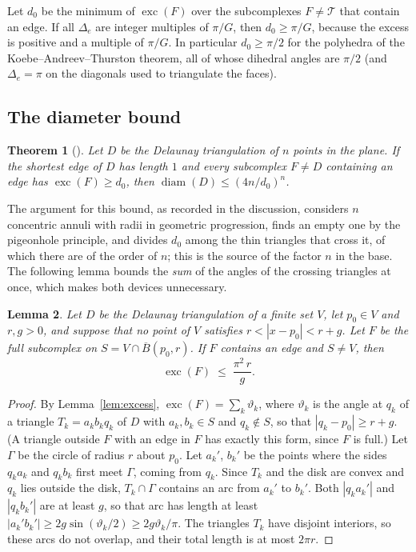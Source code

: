 \documentclass[11pt]{amsart}
\newtheorem{theorem}{Theorem}[section]
\newtheorem{lemma}[theorem]{Lemma}
\theoremstyle{definition}
\theoremstyle{remark}
\newcommand{\cT}{\mathcal{T}}
\DeclareMathOperator{\diam}{diam}
\DeclareMathOperator{\exc}{exc}
\begin{document}
Let $d_0$ be the minimum of $\exc(F)$ over the subcomplexes $F\neq\cT$ that contain an edge. If all $\Delta_e$ are integer multiples of $\pi/G$, then $d_0\ge\pi/G$, because the excess is positive and a multiple of $\pi/G$.
In particular $d_0\ge\pi/2$ for the polyhedra of the Koebe--Andreev--Thurston theorem, all of whose dihedral angles are $\pi/2$ (and $\Delta_e=\pi$ on the diagonals used to triangulate the faces).

\subsection{The diameter bound}

\begin{theorem}[{\cite[Theorem~6.3]{Riv03}}]\label{thm:six-three}
Let $D$ be the Delaunay triangulation of $n$ points in the plane. If the shortest edge of $D$ has length $1$ and every subcomplex $F\neq D$ containing an edge has $\exc(F)\ge d_0$, then $\diam(D)\le(4n/d_0)^n$.
\end{theorem}

The argument for this bound, as recorded in the discussion, considers $n$ concentric annuli with radii in geometric progression, finds an empty one by the pigeonhole principle, and divides $d_0$ among the thin triangles that cross it, of which there are of the order of $n$; this is the source of the factor $n$ in the base.
The following lemma bounds the \emph{sum} of the angles of the crossing triangles at once, which makes both devices unnecessary.

\begin{lemma}\label{lem:annulus}
Let $D$ be the Delaunay triangulation of a finite set $V$, let $p_0\in V$ and $r,g>0$, and suppose that no point of $V$ satisfies $r<|x-p_0|<r+g$. Let $F$ be the full subcomplex on $S=V\cap\overline B(p_0,r)$. If $F$ contains an edge and $S\neq V$, then
\[
\exc(F)\;\le\;\frac{\pi^2\,r}{g}.
\]
\end{lemma}

\begin{proof}
By Lemma~\ref{lem:excess}, $\exc(F)=\sum_k\vartheta_k$, where $\vartheta_k$ is the angle at $q_k$ of a triangle $T_k=a_kb_kq_k$ of $D$ with $a_k,b_k\in S$ and $q_k\notin S$, so that $|q_k-p_0|\ge r+g$. (A triangle outside $F$ with an edge in $F$ has exactly this form, since $F$ is full.)
Let $\Gamma$ be the circle of radius $r$ about $p_0$. Let $a_k'$, $b_k'$ be the points where the sides $q_ka_k$ and $q_kb_k$ first meet $\Gamma$, coming from $q_k$. Since $T_k$ and the disk are convex and $q_k$ lies outside the disk, $T_k\cap\Gamma$ contains an arc from $a_k'$ to $b_k'$. Both $|q_ka_k'|$ and $|q_kb_k'|$ are at least $g$, so that arc has length at least
$|a_k'b_k'|\ge2g\sin(\vartheta_k/2)\ge2g\vartheta_k/\pi$. The triangles $T_k$ have disjoint interiors, so these arcs do not overlap, and their total length is at most $2\pi r$.
\end{proof}
\end{document}
